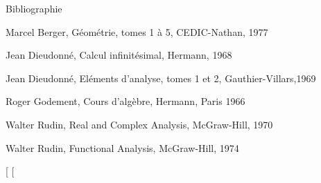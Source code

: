 Bibliographie

Marcel Berger, Géométrie, tomes 1 à 5, CEDIC-Nathan, 1977

Jean Dieudonné, Calcul infinitésimal, Hermann, 1968

Jean Dieudonné, Eléments d'analyse, tomes 1 et 2, Gauthier-Villars,1969

Roger Godement, Cours d'algèbre, Hermann, Paris 1966

Walter Rudin, Real and Complex Analysis, McGraw-Hill, 1970

Walter Rudin, Functional Analysis, McGraw-Hill, 1974

{[}
{[}
